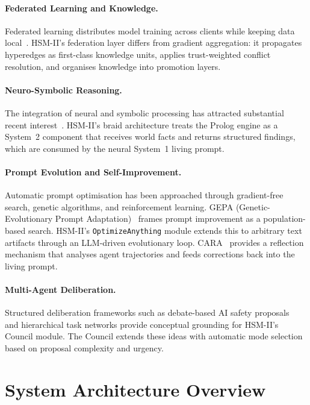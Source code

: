 \documentclass[11pt]{article}
\begin{document}
\paragraph{Federated Learning and Knowledge.}
Federated learning distributes model training across clients while keeping data
local~\cite{konecny2016federated}. HSM-II's federation layer differs from gradient
aggregation: it propagates hyperedges as first-class knowledge units, applies
trust-weighted conflict resolution, and organises knowledge into promotion layers.

\paragraph{Neuro-Symbolic Reasoning.}
The integration of neural and symbolic processing has attracted substantial recent
interest~\cite{garcez2009neural,mao2019neuro}. HSM-II's braid architecture treats
the Prolog engine as a System~2 component that receives world facts and returns
structured findings, which are consumed by the neural System~1 living prompt.

\paragraph{Prompt Evolution and Self-Improvement.}
Automatic prompt optimisation has been approached through gradient-free search,
genetic algorithms, and reinforcement learning. GEPA (Genetic-Evolutionary Prompt
Adaptation)~\cite{agrawal2025gepa} frames prompt improvement as a population-based
search. HSM-II's \texttt{OptimizeAnything} module extends this to arbitrary text
artifacts through an LLM-driven evolutionary loop. CARA~\cite{latimer2025cara}
provides a reflection mechanism that analyses agent trajectories and feeds
corrections back into the living prompt.

\paragraph{Multi-Agent Deliberation.}
Structured deliberation frameworks such as debate-based AI safety
proposals~\cite{irving2018ai} and hierarchical task networks provide conceptual
grounding for HSM-II's Council module. The Council extends these ideas with
automatic mode selection based on proposal complexity and urgency.

\section{System Architecture Overview}
\label{sec:arch}
\end{document}
